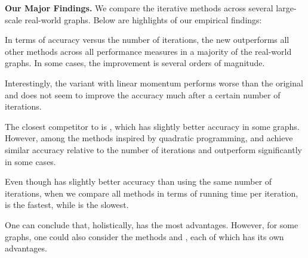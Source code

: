 \noindent \textbf{Our Major Findings.}
We compare the iterative methods across several 
large-scale
real-world  graphs. Below are highlights of our empirical findings:


\begin{compactitem}

\item 
In terms of accuracy versus the number of iterations, the new \prexp outperforms all other methods across all performance measures in a majority of the real-world graphs. In some cases, the improvement is several orders of magnitude.

Interestingly, the \prlin variant with linear momentum performs worse than the original \pr and does not seem to improve the accuracy much after a certain number of iterations.



\item 
The closest competitor to \prexp is \fista, which has slightly better accuracy in some graphs. However, among the methods inspired by quadratic programming, \elist and \greedypp achieve similar accuracy relative to the number of iterations and outperform \fista significantly in some cases.

Even though \greedypp has slightly better accuracy than \elist using the same number of iterations, when we compare all methods in terms of running time per iteration, \elist is the fastest, while \greedypp is the slowest.



\end{compactitem}

One can conclude that, holistically, \prexp has the most advantages. However, for some graphs, one could also consider the methods \elist and \fista, each of which has its own advantages.



